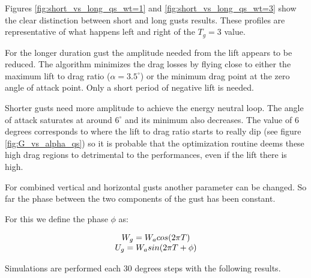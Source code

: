 \par Figures \ref{fig:short_vs_long_qs_wt=1} and \ref{fig:short_vs_long_qs_wt=3} show the clear distinction between short and long gusts results.
These profiles are representative of what happens left and right of the $T_g=3$ value.

\par For the longer duration gust the amplitude needed from the lift appears to be reduced.
The algorithm minimizes the drag losses by flying close to either the maximum lift to drag ratio ($\alpha = 3.5 ^{\circ}$) or the minimum drag point at the zero angle of attack point.
Only a short period of negative lift is needed.

\par Shorter gusts need more amplitude to achieve the energy neutral loop.
The angle of attack saturates at around $6^{\circ}$ and its minimum also decreases.
The value of 6 degrees corresponds to where the lift to drag ratio starts to really dip (see figure \ref{fig:G_vs_alpha_qs}) so it is probable that the optimization routine deems these high drag regions to detrimental to the performances, even if the lift there is high. 


\FloatBarrier
{}
For combined vertical and horizontal gusts another parameter can be changed.
So far the phase between the two components of the gust has been constant.

\par For this we define the phase $\phi$ as:

\begin{equation}
  \begin{array}[c]{c}
    W_g=W_a cos(2\pi T) \\
    U_g=W_a sin(2\pi T + \phi)
  \end{array}
  \label{eqn:combined_gust_phase}
\end{equation}

Simulations are performed each 30 degrees steps with the following results.


